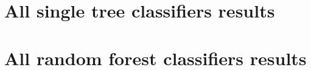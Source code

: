 \documentclass[a4paper]{article}
\begin{document}



\onecolumn
\newpage
\appendix
\section{All single tree classifiers results}
% 


\newpage
\section{All random forest classifiers results}
% 

\end{document}

